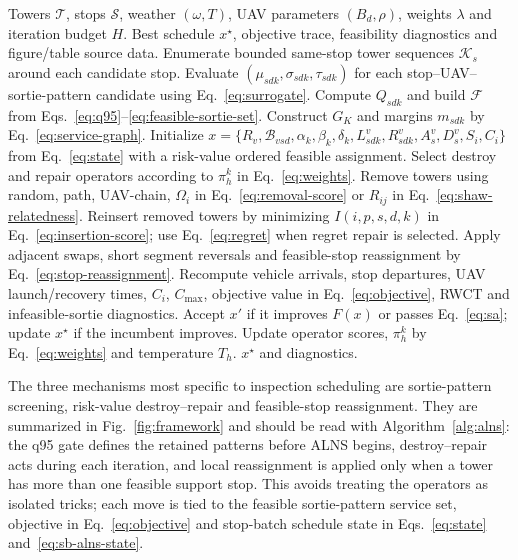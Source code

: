 \begin{algorithm}[t]
\caption{Probabilistic risk-value ALNS for vehicle--UAV inspection}
\label{alg:alns}
\begin{algorithmic}[1]
\Require Towers $\mathcal{T}$, stops $\mathcal{S}$, weather $(\omega,T)$, UAV parameters $(B_d,\rho)$, weights $\lambda$ and iteration budget $H$.
\Ensure Best schedule $x^\star$, objective trace, feasibility diagnostics and figure/table source data.
\State Enumerate bounded same-stop tower sequences $\mathcal{K}_s$ around each candidate stop.
\State Evaluate $(\mu_{sdk},\sigma_{sdk},\tau_{sdk})$ for each stop--UAV--sortie-pattern candidate using Eq.~\eqref{eq:surrogate}.
\State Compute $Q_{sdk}$ and build $\mathcal{F}$ from Eqs.~\eqref{eq:q95}--\eqref{eq:feasible-sortie-set}.
\State Construct $G_K$ and margins $m_{sdk}$ by Eq.~\eqref{eq:service-graph}.
\State Initialize $x=\{R_v,\mathcal{B}_{vsd},\alpha_k,\beta_k,\delta_k,L^v_{sdk},R^v_{sdk},A^v_s,D^v_s,S_i,C_i\}$ from Eq.~\eqref{eq:state} with a risk-value ordered feasible assignment.
  \State Select destroy and repair operators according to $\pi_h^k$ in Eq.~\eqref{eq:weights}.
  \State Remove towers using random, path, UAV-chain, $\Omega_i$ in Eq.~\eqref{eq:removal-score} or $R_{ij}$ in Eq.~\eqref{eq:shaw-relatedness}.
  \State Reinsert removed towers by minimizing $I(i,p,s,d,k)$ in Eq.~\eqref{eq:insertion-score}; use Eq.~\eqref{eq:regret} when regret repair is selected.
  \State Apply adjacent swaps, short segment reversals and feasible-stop reassignment by Eq.~\eqref{eq:stop-reassignment}.
  \State Recompute vehicle arrivals, stop departures, UAV launch/recovery times, $C_i$, $C_{\max}$, objective value in Eq.~\eqref{eq:objective}, RWCT and infeasible-sortie diagnostics.
  \State Accept $x'$ if it improves $F(x)$ or passes Eq.~\eqref{eq:sa}; update $x^\star$ if the incumbent improves.
  \State Update operator scores, $\pi_h^k$ by Eq.~\eqref{eq:weights} and temperature $T_h$.
\EndFor
\State \Return $x^\star$ and diagnostics.
\end{algorithmic}
\end{algorithm}

The three mechanisms most specific to inspection scheduling are sortie-pattern screening, risk-value destroy--repair and feasible-stop reassignment. They are summarized in Fig.~\ref{fig:framework} and should be read with Algorithm~\ref{alg:alns}: the q95 gate defines the retained patterns before ALNS begins, destroy--repair acts during each iteration, and local reassignment is applied only when a tower has more than one feasible support stop. This avoids treating the operators as isolated tricks; each move is tied to the feasible sortie-pattern service set, objective in Eq.~\eqref{eq:objective} and stop-batch schedule state in Eqs.~\eqref{eq:state} and~\eqref{eq:sb-alns-state}.

